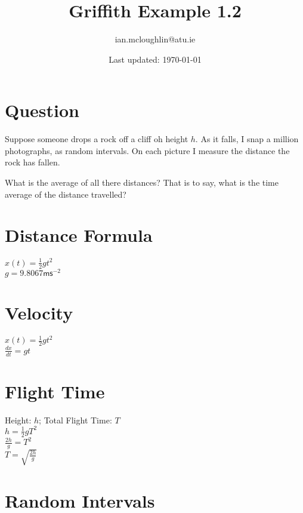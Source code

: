 \documentclass{iansnotes}
\title{Griffith Example 1.2}
\author{ian.mcloughlin@atu.ie}
\date{Last updated: \today}
\begin{document}
 
\maketitle

\section{Question}

Suppose someone drops a rock off a cliff oh height $h$.
As it falls, I snap a million photographs, as random intervals.
On each picture I measure the distance the rock has fallen.

What is the average of all there distances?
That is to say, what is the time average of the distance travelled?
 
\section{Distance Formula}
$x(t) = \frac{1}{2} gt^2$\\[4mm]
$g = 9.8067 \textsf{ms}^{-2}$\\[4mm]
\begin{marginfigure}[-20mm]
\end{marginfigure}

\section{Velocity}
$x(t) = \frac{1}{2}gt^2$\\[4mm]
$\frac{dx}{dt} = gt$\\[4mm]
\begin{marginfigure}
\end{marginfigure}

\section{Flight Time}
Height: $h$; \hspace{2mm}Total Flight Time: $T$\\[4mm]
$h = \frac{1}{2}gT^2$ \\[4mm]
$\frac{2h}{g} = T^2$ \\[4mm]
$T = \sqrt{\frac{2h}{g}}$

\section{Random Intervals}
\end{document}
